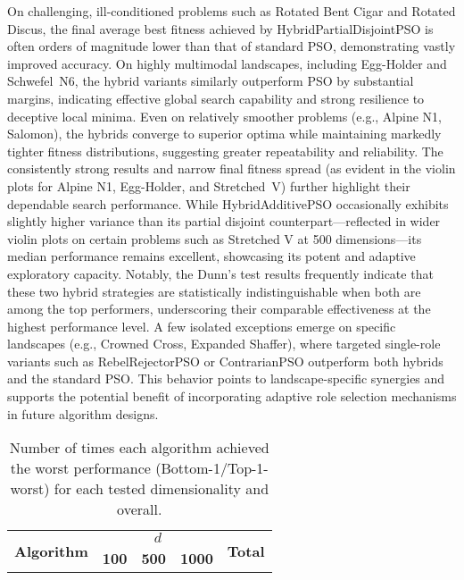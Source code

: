 {On challenging, ill-conditioned problems such as Rotated Bent Cigar and Rotated Discus, the final average best fitness achieved by HybridPartialDisjointPSO is often orders of magnitude lower than that of standard PSO, demonstrating vastly improved accuracy. On highly multimodal landscapes, including Egg-Holder and Schwefel~N6, the hybrid variants similarly outperform PSO by substantial margins, indicating effective global search capability and strong resilience to deceptive local minima. Even on relatively smoother problems (e.g., Alpine N1, Salomon), the hybrids converge to superior optima while maintaining markedly tighter fitness distributions, suggesting greater repeatability and reliability. The consistently strong results and narrow final fitness spread (as evident in the violin plots for Alpine N1, Egg-Holder, and Stretched~V) further highlight their dependable search performance.
While Hy\-brid\-Ad\-di\-tivePSO occasionally exhibits slightly higher variance than its partial disjoint counterpart---reflected in wider violin plots on certain problems such as Stretched V at 500 dimensions---its median performance remains excellent, showcasing its potent and adaptive exploratory capacity. Notably, the Dunn’s test results frequently indicate that these two hybrid strategies are statistically indistinguishable when both are among the top performers, underscoring their comparable effectiveness at the highest performance level.
A few isolated exceptions emerge on specific landscapes (e.g., Crowned Cross, Expanded Shaffer), where targeted single-role variants such as RebelRejectorPSO or ContrarianPSO outperform both hybrids and the standard PSO. This behavior points to land\-scape\--spe\-cific synergies and supports the potential benefit of incorporating adaptive role selection mechanisms in future algorithm designs.





\begin{longtable}[c]{p{5cm}cccc}
\caption[Frequency of worst results by algorithm and dimension]{Number of times each algorithm achieved the worst performance (Bottom-1/Top-1-worst) for each tested dimensionality and overall.}
\label{tab:algo-worst1-counts} \\
\toprule
\multirow{2}{*}{\textbf{Algorithm}} & \multicolumn{3}{c}{$d$} & \multirow{2}{*}{\textbf{Total}}  \\
\cmidrule(lr){2-4}
 & \textbf{100} & \textbf{500} & \textbf{1000} \\ \midrule
\endfirsthead


\end{longtable}}
